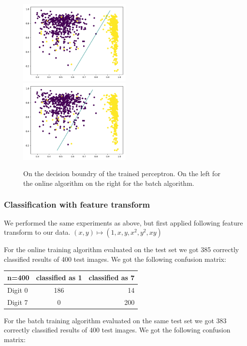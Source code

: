 \begin{figure}
\includegraphics[width = 0.5\textwidth]{figures/decision_simple_online}
\includegraphics[width = 0.5\textwidth]{figures/decision_simple_batch}
\caption{On the decision boundry of the trained perceptron. On the left for the online algorithm on the right for the batch algorithm.}
\label{perceptron:decision:simple}
\end{figure}

\subsubsection{Classification with feature transform}
We performed the same experiments as above, but first applied following feature transform to our data. $(x,y)\mapsto (1,x,y,x^2,y^2,xy)$

For the online training algorithm evaluated on the test set we got 385 correctly classified results of 400 test images. We got the following confusion matrix:

\begin{tabular}{ l | c | r }
\centering
  n=400 & classified as 1 & classified as 7 \\ \hline
  Digit 0 & 186 & 14 \\
  Digit 7 & 0 & 200 \\
\end{tabular}

For the batch training algorithm evaluated on the same test set we got 383 correctly classified results of 400 test images. We got the following confusion matrix:

